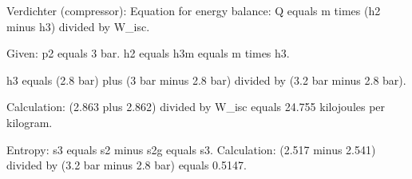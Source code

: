 Verdichter (compressor):  
Equation for energy balance:  
Q equals m times (h2 minus h3) divided by W_isc.  

Given:  
p2 equals 3 bar.  
h2 equals h3m equals m times h3.  

h3 equals (2.8 bar) plus (3 bar minus 2.8 bar) divided by (3.2 bar minus 2.8 bar).  

Calculation:  
(2.863 plus 2.862) divided by W_isc equals 24.755 kilojoules per kilogram.  

Entropy:  
s3 equals s2 minus s2g equals s3.  
Calculation:  
(2.517 minus 2.541) divided by (3.2 bar minus 2.8 bar) equals 0.5147.
